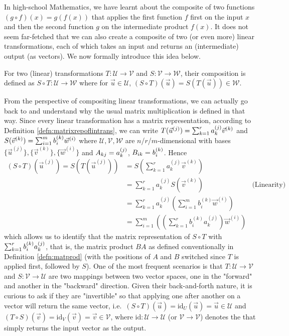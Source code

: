 In high-school Mathematics, we have learnt about the composite of two functions $(g \circ f)(x) = g(f(x))$ that applies the first function $f$ first on the input $x$ and then the second function $g$ on the intermediate product $f(x)$. It does not seem far-fetched that we can also create a composite of two (or even more) linear transformations, each of which takes an input and returns an (intermediate) output (as vectors). We now formally introduce this idea below.
\begin{defn}
For two (linear) transformations $T: \mathcal{U} \to \mathcal{V}$ and $S: \mathcal{V} \to \mathcal{W}$, their composition is defined as $S \circ T: \mathcal{U} \to \mathcal{W}$ where for $\vec{u} \in \mathcal{U}$, $(S \circ T)(\vec{u}) = S(T(\vec{u})) \in \mathcal{W}$.
\end{defn}
From the perspective of compositing linear transformations, we can actually go back to and understand why the usual matrix multiplication is defined in that way. Since every linear transformation has a matrix representation, according to Definition \ref{defn:matrixrepoflintrans}, we can write $T(\vec{u}^{(j)}) = \sum_{k=1}^{r} \smash{a_k^{(j)}}\vec{v}^{(k)}$ and $S(\vec{v}^{(k)}) = \sum_{i=1}^{m} \smash{b_i^{(k)}}\vec{w}^{(i)}$ where $\mathcal{U}, \mathcal{V}, \mathcal{W}$ are $n$/$r$/$m$-dimensional with bases $\{\vec{u}^{(j)}\}, \{\vec{v}^{(k)}\}, \{\vec{w}^{(i)}\}$ and $A_{kj} = \smash{a_k^{(j)}}$, $B_{ik} = \smash{b_i^{(k)}}$. Hence
\begin{align*}
(S \circ T)(\vec{u}^{(j)}) = S(T(\vec{u}^{(j)})) &= S\left(\sum_{k=1}^{r} a_k^{(j)}\vec{v}^{(k)}\right) \\
&= \sum_{k=1}^{r} a_k^{(j)}S(\vec{v}^{(k)}) & \text{(Linearity)} \\
&= \sum_{k=1}^{r} a_k^{(j)}\left(\sum_{i=1}^{m} b_i^{(k)}\vec{w}^{(i)}\right) \\
&= \sum_{i=1}^{m} \left(\left(\sum_{k=1}^{r} b_i^{(k)} a_k^{(j)}\right) \vec{w}^{(i)}\right) 
\end{align*}
which allows us to identify that the matrix representation of $S \circ T$ with $\sum_{k=1}^{r} \smash{b_i^{(k)} a_k^{(j)}}$, that is, the matrix product $BA$ as defined conventionally in Definition \ref{defn:matprod} (with the positions of $A$ and $B$ switched since $T$ is applied first, followed by $S$). One of the most frequent scenarios is that $T: \mathcal{U} \to \mathcal{V}$ and $S: \mathcal{V} \to \mathcal{U}$ are two mappings between two vector spaces, one in the "forward" and another in the "backward" direction. Given their back-and-forth nature, it is curious to ask if they are "invertible" so that applying one after another on a vector will return the same vector, i.e.\ $(S \circ T)(\vec{u}) = \text{id}_{U}(\vec{u}) = \vec{u} \in \mathcal{U}$ and $(T \circ S)(\vec{v}) = \text{id}_{V}(\vec{v}) = \vec{v} \in \mathcal{V}$, where $\text{id}: \mathcal{U} \to \mathcal{U}$ (or $\mathcal{V} \to \mathcal{V}$) denotes the  that simply returns the input vector as the output.
